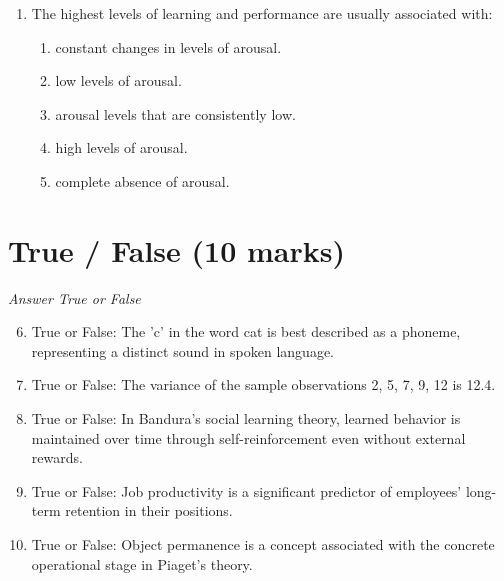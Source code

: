 \documentclass[12pt]{article}
\begin{document}
\begin{enumerate}[label=\arabic*.]
\begin{enumerate}[label=(\alph*)]
    \item that language is a uniquely human skill.
    \item the importance of physical contact to development.
    \item that primates have a hierarchy based on physical strength.
    \item that monkeys have a preference for inanimate objects.
    \item that primates can learn complex tasks.
\end{enumerate}
\item The highest levels of learning and performance are usually associated with:
\begin{enumerate}[label=(\alph*)]
    \item constant changes in levels of arousal.
    \item low levels of arousal.
    \item arousal levels that are consistently low.
    \item high levels of arousal.
    \item complete absence of arousal.
\end{enumerate}
\end{enumerate}

\section*{True / False (10 marks)}
\textit{Answer True or False}
\begin{enumerate}[label=\arabic*.]
\setcounter{enumi}{5}
\item True or False: The 'c' in the word cat is best described as a phoneme, representing a distinct sound in spoken language.
\item True or False: The variance of the sample observations 2, 5, 7, 9, 12 is 12.4.
\item True or False: In Bandura's social learning theory, learned behavior is maintained over time through self-reinforcement even without external rewards.
\item True or False: Job productivity is a significant predictor of employees' long-term retention in their positions.
\item True or False: Object permanence is a concept associated with the concrete operational stage in Piaget's theory.
\end{enumerate}
\end{document}
